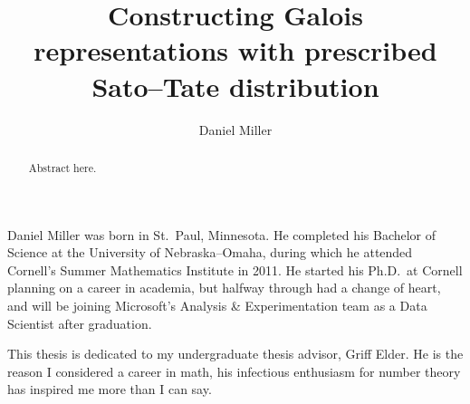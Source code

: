 \documentclass[phd,cornellheadings]{cornell}
\title{Constructing Galois representations with prescribed Sato--Tate 
distribution}
\author{Daniel Miller}
\begin{document}
\maketitle
\makecopyright

\begin{abstract}
Abstract here. 
\end{abstract}

\begin{biosketch}
Daniel Miller was born in St.~Paul, Minnesota. He completed his Bachelor of 
Science at the University of Nebraska--Omaha, during which he attended 
Cornell's Summer Mathematics Institute in 2011. He started his Ph.D.~at 
Cornell planning on a career in academia, but halfway through had a change of 
heart, and will be joining Microsoft's Analysis \& Experimentation team as a 
Data Scientist after graduation. 
\end{biosketch}

\begin{dedication}
This thesis is dedicated to my undergraduate thesis advisor, Griff Elder. 
He is the reason I considered a career in math, his infectious enthusiasm for 
number theory has inspired me more than I can say. 
\end{dedication}
\end{document}
